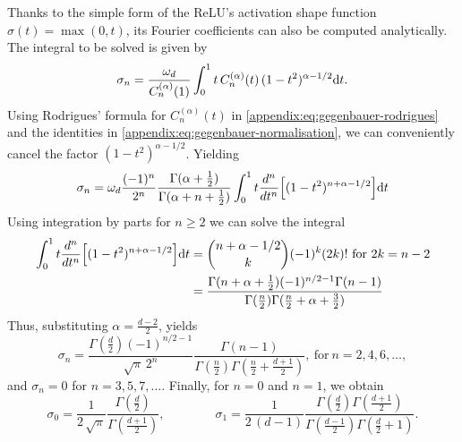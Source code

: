 Thanks to the simple form of the ReLU's activation shape function $\sigma(t) = \max(0, t)$, its Fourier coefficients can also be computed analytically. The integral to be solved is given by
\begin{equation}
    \sigma_{n} = 
   \frac{\omega_{d}}{C_n^{(\alpha)}(1)} 
   \int_{0}^1 t\,C_n^{(\alpha)}(t)\,(1 - t^2)^{\alpha - 1/2} \mathrm{d}{t}.
\end{equation}
Using Rodrigues' formula for $C_n^{(\alpha)}(t)$ in \cref{appendix:eq:gegenbauer-rodrigues} and the identities in \cref{appendix:eq:gegenbauer-normalisation}, we can conveniently cancel the factor $(1 - t^2)^{\alpha - 1/2}$. Yielding
\begin{equation}
    \sigma_{n} = 
    \omega_{d}
  {\frac {(-1)^{n}}{2^{n}}}{\frac {\Gamma (\alpha +{\frac {1}{2}})}{\Gamma (\alpha +n+{\frac {1}{2}})}} 
  \int_0^1 t {\frac {d^{n}}{dt^{n}}}\left[(1-t^{2})^{n+\alpha -1/2}\right] \calcd{t}
\end{equation}
Using integration by parts for $n \ge 2$ we can solve the integral \citep[Appendix D]{bach2017breaking}
\begin{align}
  \int_0^1 t {\frac {d^{n}}{dt^{n}}}\left[(1-t^{2})^{n+\alpha -1/2}\right] \calcd{t} &= 
    \binom{n + \alpha - 1/2}{k} (-1)^k (2k)!\ \text{for}\ 2k= n - 2 \\
    &= \frac{ \Gamma(n + \alpha + \frac{1}{2}) (-1)^{n/2-1} \Gamma(n-1)}{\Gamma(\frac{n}{2}) \Gamma(\frac{n}{2} + \alpha + \frac{3}{2})}
\end{align}
Thus, substituting $\alpha = \frac{d-2}{2}$, yields
\begin{equation}
    \sigma_{n} = 
        \frac{\Gamma(\frac{d}{2}) (-1)^{n/2 - 1}}{\sqrt{\pi}\,2^n} \frac{\Gamma(n-1)}{\Gamma(\frac{n}{2}) \Gamma(\frac{n}{2} + \frac{d+1}{2})},\ \text{for}\ n = 2, 4, 6, \ldots,
\end{equation}
and $\sigma_{n}=0$ for $n=3, 5, 7, \dots$. Finally, for $n = 0$ and $n = 1$, we obtain
\begin{equation}
    \sigma_0 = \frac{1}{2\, \sqrt{\pi}} \frac{\Gamma(\frac{d}{2})}{\Gamma(\frac{d+1}{2})}, \qquad \qquad
    \sigma_1 = \frac{1}{2\, (d-1)} \frac{\Gamma(\frac{d}{2}) \Gamma(\frac{d+1}{2})}{\Gamma(\frac{d-1}{2}) \Gamma(\frac{d}{2} + 1)}.
\end{equation}

